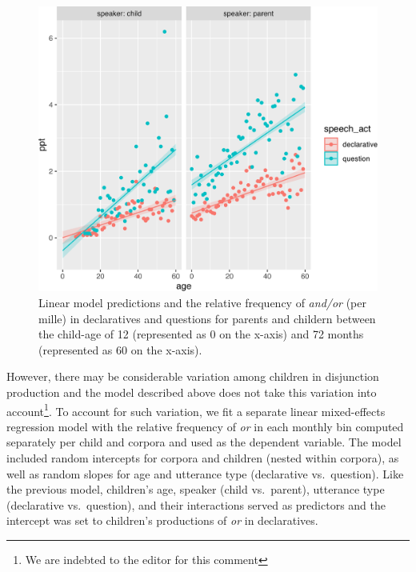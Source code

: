 \documentclass[
  english,
  ,man,floatsintext]{apa6}
\begin{document}
\begin{figure}[H]

{\centering \includegraphics{figs/disjunctionPrediction-1} 

}

\caption{Linear model predictions and the relative frequency of \textit{and/or} (per mille) in declaratives and questions for parents and childern between the child-age of 12 (represented as 0 on the x-axis) and 72 months (represented as 60 on the x-axis).}\label{fig:disjunctionPrediction}
\end{figure}

However, there may be considerable variation among children in disjunction production and the model described above does not take this variation into account\footnote{We are indebted to the editor for this comment}. To account for such variation, we fit a separate linear mixed-effects regression model with the relative frequency of \emph{or} in each monthly bin computed separately per child and corpora and used as the dependent variable. The model included random intercepts for corpora and children (nested within corpora), as well as random slopes for age and utterance type (declarative vs.~question). Like the previous model, children's age, speaker (child vs.~parent), utterance type (declarative vs.~question), and their interactions served as predictors and the intercept was set to children's productions of \emph{or} in declaratives.
\end{document}
